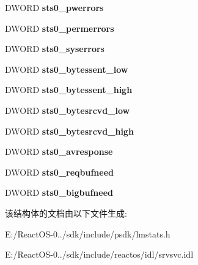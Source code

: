 \begin{DoxyCompactItemize}
D\+W\+O\+RD {\bfseries sts0\+\_\+pwerrors}
\item 
\mbox{\label{struct___s_t_a_t___s_e_r_v_e_r__0_ab349f4cc6d05e6c0e474c8c094bd8084}} 
D\+W\+O\+RD {\bfseries sts0\+\_\+permerrors}
\item 
\mbox{\label{struct___s_t_a_t___s_e_r_v_e_r__0_ac35f27fe2b6e9a3f8ab6d1f716bb8cac}} 
D\+W\+O\+RD {\bfseries sts0\+\_\+syserrors}
\item 
\mbox{\label{struct___s_t_a_t___s_e_r_v_e_r__0_a83e14e5835df0f34232db2bd32340a8c}} 
D\+W\+O\+RD {\bfseries sts0\+\_\+bytessent\+\_\+low}
\item 
\mbox{\label{struct___s_t_a_t___s_e_r_v_e_r__0_a09a5b9a0c7d04686d7519e5312c3fa02}} 
D\+W\+O\+RD {\bfseries sts0\+\_\+bytessent\+\_\+high}
\item 
\mbox{\label{struct___s_t_a_t___s_e_r_v_e_r__0_aacde904cc400737862b8903dea573915}} 
D\+W\+O\+RD {\bfseries sts0\+\_\+bytesrcvd\+\_\+low}
\item 
\mbox{\label{struct___s_t_a_t___s_e_r_v_e_r__0_a0bbff19c534bb84f87bb2652069d28fd}} 
D\+W\+O\+RD {\bfseries sts0\+\_\+bytesrcvd\+\_\+high}
\item 
\mbox{\label{struct___s_t_a_t___s_e_r_v_e_r__0_a0db9c6644fdbf99e17a99feca77bb446}} 
D\+W\+O\+RD {\bfseries sts0\+\_\+avresponse}
\item 
\mbox{\label{struct___s_t_a_t___s_e_r_v_e_r__0_a6d7d402a0b0f3f1bca37e8879c4a93ed}} 
D\+W\+O\+RD {\bfseries sts0\+\_\+reqbufneed}
\item 
\mbox{\label{struct___s_t_a_t___s_e_r_v_e_r__0_aad70a01b9d2336bc9bec867042969b58}} 
D\+W\+O\+RD {\bfseries sts0\+\_\+bigbufneed}
\end{DoxyCompactItemize}


该结构体的文档由以下文件生成\+:\begin{DoxyCompactItemize}
\item 
E\+:/\+React\+O\+S-\/0../sdk/include/psdk/lmstats.\+h\item 
E\+:/\+React\+O\+S-\/0../sdk/include/reactos/idl/srvsvc.\+idl\end{DoxyCompactItemize}
